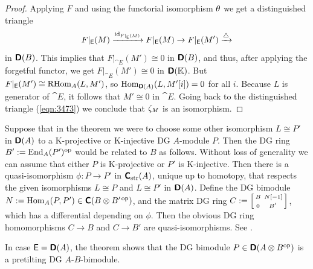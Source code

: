 \begin{proof}
Applying $F$ and using the functorial isomorphism $\theta$ we get a 
distinguished triangle
\begin{equation} \label{eqn:3474}
F|_{\operatorname{\mathsf{E}}}(M) \xrightarrow{\operatorname{id}_{F|_{\operatorname{\mathsf{E}}}(M)}} F|_{\operatorname{\mathsf{E}}}(M)
\to F|_{\operatorname{\mathsf{E}}}(M') \xrightarrow{\triangle}
\end{equation}
in $\boldsymbol{\mathsf{D}}(B)$. This implies that 
$F|_{\cat{E}}(M') \cong 0$ in $\boldsymbol{\mathsf{D}}(B)$, and thus, after applying the 
forgetful functor, we get $F|_{\cat{E}}(M') \cong 0$ in $\boldsymbol{\mathsf{D}}(\mathbb{K})$. But 
$F|_{\operatorname{\mathsf{E}}}(M') \cong \operatorname{RHom}_{A}(L, M')$,
so 
$\operatorname{Hom}_{\boldsymbol{\mathsf{D}}(A)}(L, M'[i]) = 0$ 
for all $i$. Because $L$ is generator of $\cat{E}$, it follows that 
$M' \cong 0$ in $\cat{E}$. Going back to the distinguished 
triangle (\ref{eqn:3473}) we conclude that $\zeta_M$ is an isomorphism.
\end{proof}

\begin{rem} \label{rem:3435}
Suppose that in the theorem we were to choose some other isomorphism 
$L \cong P'$ in $\boldsymbol{\mathsf{D}}(A)$ to a K-projective or K-injective DG $A$-module 
$P$. Then the DG ring $B' := \operatorname{End}_A(P')^{\mathrm{op}}$
would be related to $B$ as follows. Without loss of generality we can assume 
that either $P$ is K-projective or $P'$ is K-injective. Then there is a 
quasi-isomorphism $\phi : P \to P'$ in $\boldsymbol{\mathsf{C}}_{\mathrm{str}}(A)$, 
unique up to homotopy, that respects the given isomorphisms 
$L \cong P$ and $L \cong P'$ in $\boldsymbol{\mathsf{D}}(A)$. 
Define the DG bimodule 
$N := \operatorname{Hom}_A(P, P') \in \boldsymbol{\mathsf{C}}(B \otimes B'^{\, \mathrm{op}})$, 
and the matrix DG ring 
$C := \left[ \begin{smallmatrix} B & \, N[-1] \\[0.2em] 0 & B' \end{smallmatrix} \right]$,
which has a differential depending on $\phi$. 
Then the obvious DG ring homomorphisms $C \to B$ and $C \to B'$ are 
quasi-isomorphisms. See \cite[Proposition 3.3]{PSY2}. 
\end{rem}

\begin{exa}  \label{exa:3432}
In case $\operatorname{\mathsf{E}} = \boldsymbol{\mathsf{D}}(A)$, the theorem shows that the DG bimodule 
$P \in \boldsymbol{\mathsf{D}}(A \otimes B^{\mathrm{op}})$ 
is a pretilting DG $A$-$B$-bimodule. 
\end{exa}

